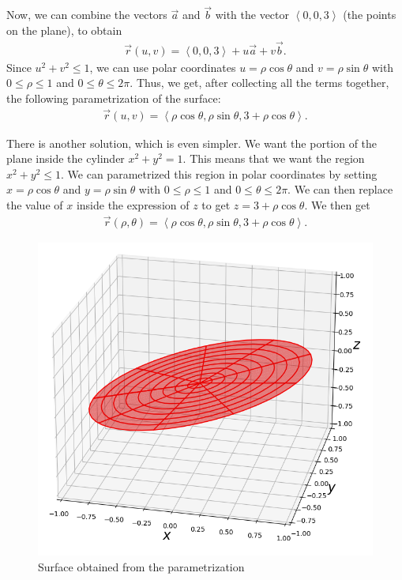 	Now, we can combine the vectors $\vec{a}$ and $\vec{b}$ with the vector $\left\langle 0, 0, 3 \right\rangle$ (the points on the plane), to obtain
		\begin{align*}
		\vec{r} (u, v) = \left\langle 0 , 0, 3 \right\rangle + u \vec{a} + v \vec{b} .
		\end{align*}
	Since $u^2 + v^2 \leq 1$, we can use polar coordinates $u = \rho\cos \theta$ and $v = \rho \sin \theta$ with $0 \leq \rho \leq 1$ and $0 \leq \theta \leq 2\pi$. Thus, we get, after collecting all the terms together, the following parametrization of the surface:
		\begin{align*}
		\vec{r} (u, v) = \left\langle \rho \cos \theta , \rho \sin \theta , 3 + \rho \cos \theta \right\rangle .
		\end{align*}
		
	There is another solution, which is even simpler. We want the portion of the plane inside the cylinder $x^2 + y^2 = 1$. This means that we want the region $x^2 + y^2 \leq 1$. We can parametrized this region in polar coordinates by setting $x = \rho \cos \theta$ and $y = \rho \sin \theta$ with $0 \leq \rho \leq 1$ and $0 \leq \theta \leq 2\pi$. We can then replace the value of $x$ inside the expression of $z$ to get $z = 3 + \rho \cos \theta$. We then get
		\begin{align*}
		\vec{r} (\rho , \theta ) = \left\langle \rho \cos \theta , \rho \sin \theta , 3 + \rho \cos \theta \right\rangle .
		\end{align*}
	
	\begin{figure}
		\centering
		\includegraphics[scale=0.6]{picture5.png}
		\caption{Surface obtained from the parametrization}
	\end{figure}
	
